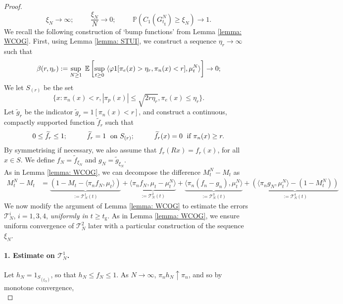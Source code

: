 \begin{proof}
\begin{equation}
       \xi_N\rightarrow \infty; \hspace{1cm} \frac{\xi_N}{N}\rightarrow 0; \hspace{1cm}\mathbb{P}(C_1(G^N_{t_\mathrm{g}})\geq \xi_N)\rightarrow 1.
   \end{equation}  We recall the following construction of `bump functions' from Lemma \ref{lemma: WCOG}. First, using Lemma \ref{lemma: STUI}, we construct a sequence $\eta_r \rightarrow \infty$ such that \begin{equation}\label{eq: choice of etar 1}
    \beta(r, \eta_r):=\sup_{N\geq 1} \hspace{0.1cm} \mathbb{E}\left[\sup_{t\geq 0}\hspace{0.1cm}\langle \varphi 1[\pi_e(x)>\eta_r, \pi_n(x)< r], \mu^N_t\rangle \right]\rightarrow 0;
\end{equation} We let $S_{(r)}$ be the set \begin{equation}
       \{x: \pi_n(x)< r, |\pi_p(x)|\leq \sqrt{2r\eta_r}, \pi_e(x)\leq \eta_r\}.
   \end{equation} Let $\widetilde{g}_r$ be the indicator $\widetilde{g}_r=1[\pi_n(x)< r]$, and construct a continuous, compactly supported function $\widetilde{f}_r$ such that \begin{equation}
      0\leq \widetilde{f}_r\leq 1;\hspace{1cm} \widetilde{f}_r=1 \hspace{0.1cm} \text{ on } S_{(r)};\hspace{1cm} \widetilde{f}_r(x)=0 \hspace{0.1cm} \text{ if } \pi_n(x)\ge r.
   \end{equation} By symmetrising if necessary, we also assume that $f_r(Rx)=f_r(x)$, for all $x\in S$. We define $f_N=\widetilde{f}_{\xi_N}$ and $g_N=\widetilde{g}_{\xi_N}$. \medskip \\ As in Lemma \ref{lemma: WCOG}, we can decompose the difference $M^N_t-M_t$ as \begin{equation}\label{eq: decomposition of erorr}\begin{split} M^N_t-M_t &= \underbrace{(1-M_t-\langle \pi_n f_N, \mu_t\rangle)}_{:=\mathcal{T}^1_N(t)} + \underbrace{\langle \pi_n f_N, \mu_t-\mu^N_t\rangle}_{:=\mathcal{T}^2_N(t)} + \underbrace{\langle \pi_n (f_n-g_n), \mu^N_t\rangle}_{:=\mathcal{T}^3_N(t)} +\underbrace{(
   \langle \pi_n g_N, \mu^N_t\rangle - (1-M^N_t))}_{:=\mathcal{T}^4_N(t)}\end{split} \end{equation} We now modify the argument of Lemma \ref{lemma: WCOG} to estimate the errors $\mathcal{T}^i_N$, $i=1,3,4$, \emph{uniformly in $t\ge t_\mathrm{g}$}.  As in Lemma \ref{lemma: WCOG}, we ensure uniform convergence of $\mathcal{T}^2_N$ later with a particular construction of the sequence $\xi_N$. \paragraph{1. Estimate on $\mathcal{T}^1_N$.} Let $h_N=1_{S_{(\xi_N)}}$, so that $h_N \le f_N \le 1$. As $N\rightarrow \infty$, $\pi_n h_N \uparrow \pi_n$, and so by monotone convergence, \begin{equation}

\end{equation}
\end{proof}
